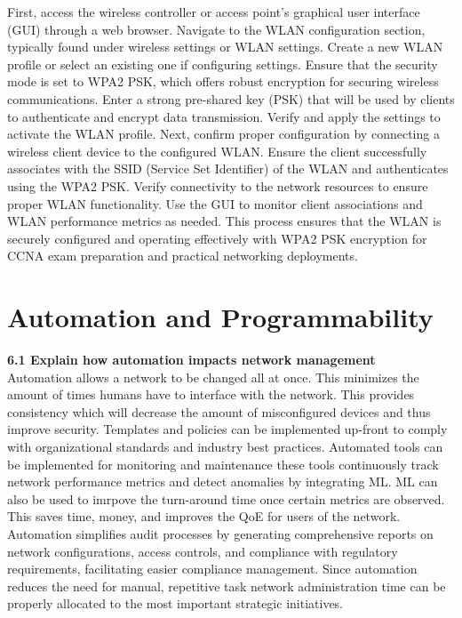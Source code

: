 \documentclass{article}
\begin{document}
	First, access the wireless controller or access point's graphical user interface (GUI) through a web browser. Navigate to the WLAN configuration section, typically found under wireless settings or WLAN settings. Create a new WLAN profile or select an existing one if configuring settings. Ensure that the security mode is set to WPA2 PSK, which offers robust encryption for securing wireless communications. Enter a strong pre-shared key (PSK) that will be used by clients to authenticate and encrypt data transmission. Verify and apply the settings to activate the WLAN profile. Next, confirm proper configuration by connecting a wireless client device to the configured WLAN. Ensure the client successfully associates with the SSID (Service Set Identifier) of the WLAN and authenticates using the WPA2 PSK. Verify connectivity to the network resources to ensure proper WLAN functionality. Use the GUI to monitor client associations and WLAN performance metrics as needed. This process ensures that the WLAN is securely configured and operating effectively with WPA2 PSK encryption for CCNA exam preparation and practical networking deployments.

\section{Automation and Programmability}
\textbf{6.1 Explain how automation impacts network management}\\

	Automation allows a network to be changed all at once. This minimizes the amount of times humans have to interface with the network. This provides consistency which will decrease the amount of misconfigured devices and thus improve security. Templates and policies can be implemented up-front to comply with organizational standards and industry best practices. Automated tools can be implemented for monitoring and maintenance these tools continuously track network performance metrics and detect anomalies by integrating ML. ML can also be used to imrpove the turn-around time once certain metrics are observed. This saves time, money, and improves the QoE for users of the network. Automation simplifies audit processes by generating comprehensive reports on network configurations, access controls, and compliance with regulatory requirements, facilitating easier compliance management. Since automation reduces the need for manual, repetitive task network administration time can be properly allocated to the most important strategic initiatives.\\
  	  
\end{document}
